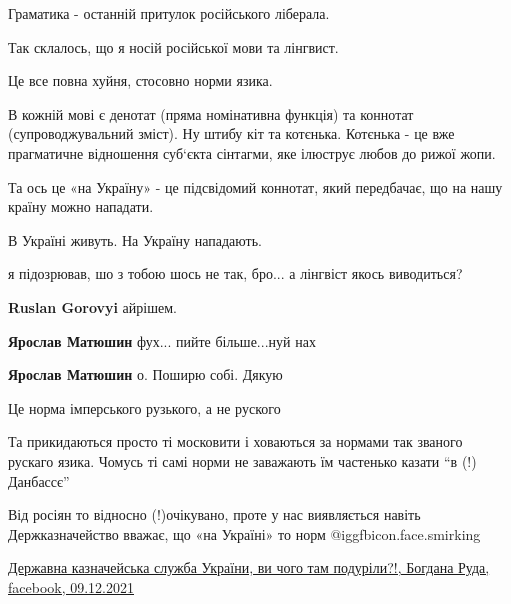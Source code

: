\begin{itemize}
Граматика - останній притулок російського ліберала.


Так склалось, що я носій російської мови та лінгвист.

Це все повна хуйня, стосовно норми язика.

В кожній мові є денотат (пряма номінативна функція) та коннотат
(супроводжувальний зміст). Ну штибу кіт та котєнька. Котєнька - це вже
прагматичне відношення суб‘єкта сінтагми, яке ілюструє любов до рижої жопи.

Та ось це «на Україну» - це підсвідомий коннотат, який передбачає, що на нашу
країну можно нападати.

В Україні живуть. На Україну нападають.

\begin{itemize} %
я підозрював, шо з тобою шось не так, бро... а лінгвіст якось виводиться?

\textbf{Ruslan Gorovyi} айрішем.

\textbf{Ярослав Матюшин} фух... пийте більше...нуй нах

\textbf{Ярослав Матюшин} о. Поширю собі. Дякую
\end{itemize} %

Це норма імперського рузького, а не руского


Та прикидаються просто ті московити і ховаються за нормами так званого рускаго
язика. Чомусь ті самі норми не заважають їм частенько казати \enquote{в (!) Данбассє}


Від росіян то відносно (!)очікувано, проте у нас виявляється навіть
Держказначейство вважає, що «на Україні» то норм @igg{fbicon.face.smirking} 

\href{https://www.facebook.com/bogdana.ruda/posts/4653629018082354}{%
Державна казначейська служба України, ви чого там подуріли?!, Богдана Руда, facebook, 09.12.2021%
}

\end{itemize} %
